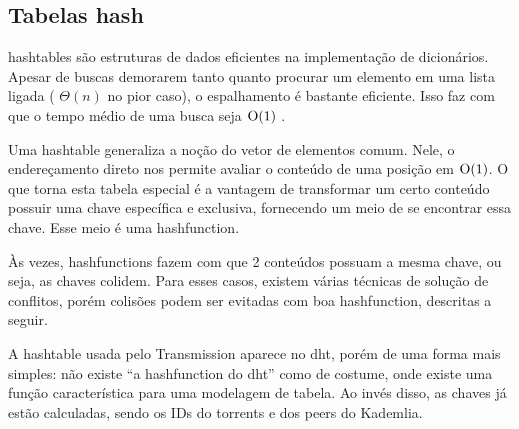 
\subsection*{Tabelas hash}

\Glspl{hashtable} são estruturas de dados eficientes na implementação de dicionários.
Apesar de buscas demorarem tanto quanto procurar um elemento em uma lista ligada (
$\Theta(n)$ no pior caso), o espalhamento é bastante eficiente. Isso faz com que o
tempo médio de uma busca seja $\textup{O}(1)$ \cite{book:clrs}.

Uma \gls*{hashtable} generaliza a noção do vetor de elementos comum. Nele, o
endereçamento direto nos permite avaliar o conteúdo de uma posição em $\textup{O}(1)$. O que
torna esta tabela especial é a vantagem de transformar um certo conteúdo possuir uma
chave específica e exclusiva, fornecendo um meio de se encontrar essa chave. Esse meio é
uma \gls{hashfunction}.

Às vezes, \glspl*{hashfunction} fazem com que 2 conteúdos possuam a mesma chave, ou
seja, as chaves colidem. Para esses casos, existem várias técnicas de solução de
conflitos, porém colisões podem ser evitadas com boa \gls*{hashfunction}, descritas a
seguir.

A \gls*{hashtable} usada pelo Transmission aparece no \gls*{dht}, porém de uma forma
mais simples: não existe ``a \gls*{hashfunction} do \gls*{dht}'' como de costume, onde
existe uma função característica para uma modelagem de tabela. Ao invés disso, as chaves
já estão calculadas, sendo os IDs do \glspl*{torrent} e dos \glspl*{peer} do Kademlia.